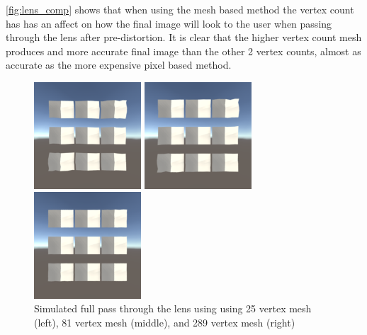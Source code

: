 \documentclass[]{article}
\begin{document}
\autoref{fig:lens_comp} shows that when using the mesh based method the vertex count has has an affect on how the final image will look to the user when passing through the lens after pre-distortion. It is clear that the higher vertex count mesh produces and more accurate final image than the other 2 vertex counts, almost as accurate as the more expensive pixel based method.

\begin{figure}[H]
	\centering
	\begin{minipage}[H]{0.2\textwidth}
		\includegraphics[width=4cm]{Inv_Vec_32}
	\end{minipage}
	\hfill
	\begin{minipage}[H]{0.2\textwidth}
		\includegraphics[width=4cm]{Inv_Vec_128}
	\end{minipage}
	\hfill
	\begin{minipage}[H]{0.2\textwidth}
		\includegraphics[width=4cm]{Inv_Vec_512}
	\end{minipage}
	\caption{Simulated full pass through the lens using using 25 vertex mesh (left), 81 vertex mesh (middle), and 289 vertex mesh (right)}
	\label{fig:lens_comp}
\end{figure}
\end{document}
